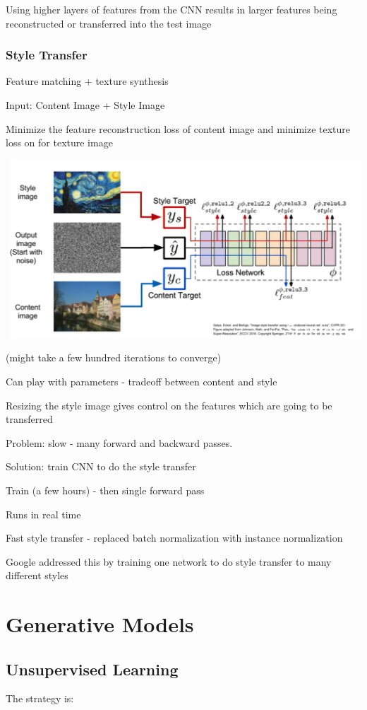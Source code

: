 Using higher layers of features from the CNN results in larger features being reconstructed or transferred into the test image

\subsubsection{Style Transfer}

Feature matching + texture synthesis

Input: Content Image + Style Image

Minimize the feature reconstruction loss of content image and minimize texture loss on for texture image

\includegraphics[width=0.5\columnwidth]{fei_fei_li/lecture_12/style_transfer.png}

(might take a few hundred iterations to converge)

Can play with parameters - tradeoff between content and style

Resizing the style image gives control on the features which are going to be transferred

Problem: slow - many forward and backward passes.

Solution: train CNN to do the style transfer

Train (a few hours) - then single forward pass

Runs in real time

Fast style transfer - replaced batch normalization with instance normalization 

Google addressed this by training one network to do style transfer to many different styles

\section{Generative Models}

\subsection{Unsupervised Learning}

The strategy is: 

